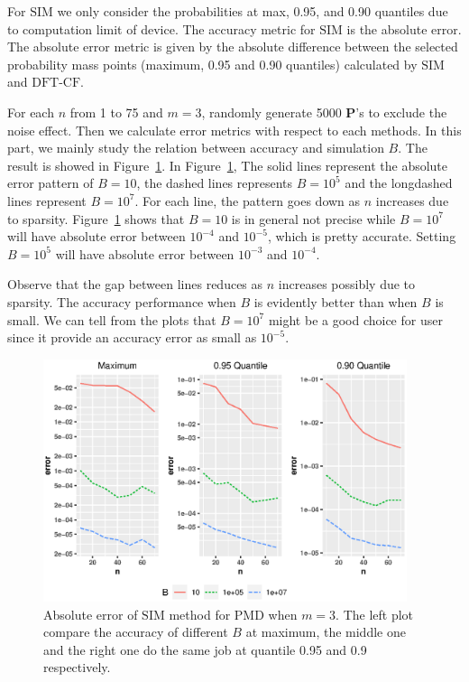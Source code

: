 \documentclass[12pt]{article}
\newcommand{\Pmat}{\mathbf{P}}
\newcommand{\PMD}{\textrm{PMD}}
\newcommand{\SIM}{{\textrm{SIM}}}
\newcommand{\dft}{{\textrm{DFT-CF}}}
\begin{document}
For $\SIM$ we only consider the probabilities at max, 0.95, and 0.90 quantiles due to computation limit of device. The accuracy metric for $\SIM$ is the absolute error. The absolute error metric is given by the absolute difference between the selected probability mass points (maximum, 0.95 and 0.90 quantiles) calculated by $\SIM$ and $\dft$.

For each $n$ from 1 to 75 and $m=3$, randomly generate 5000 $\Pmat$'s to exclude the noise effect. Then we calculate error metrics with respect to each methods. In this part, we mainly study the relation between accuracy and simulation $B$. The result is showed in Figure~\ref{fig:accuracy.sim}. In Figure~\ref{fig:accuracy.sim}, The solid lines represent the absolute error pattern of $B=10$, the dashed lines represents $B=10^5$ and the longdashed lines represent $B=10^7$. For each line, the pattern goes down as $n$ increases due to sparsity. Figure~\ref{fig:accuracy.sim} shows that $B=10$ is in general not precise while $B=10^7$ will have absolute error between $10^{-4}$ and $10^{-5}$, which is pretty accurate. Setting $B=10^5$ will have absolute error between $10^{-3}$ and $10^{-4}$.

Observe that the gap between lines reduces as $n$ increases possibly due to sparsity. The accuracy performance when $B$ is evidently better than when $B$ is small. We can tell from the plots that $B=10^7$ might be a good choice for user since it provide an accuracy error as small as $10^{-5}$.

\begin{figure}%
\begin{center}
	\includegraphics[width=0.95\textwidth]{figures/sim.eps}
	\caption{Absolute error of $\SIM$ method for $\PMD$ when $m=3$. The left plot compare the accuracy of different $B$ at maximum, the middle one and the right one do the same job at quantile 0.95 and 0.9 respectively. }
	\label{fig:accuracy.sim}
\end{center}
\end{figure}
\end{document}
